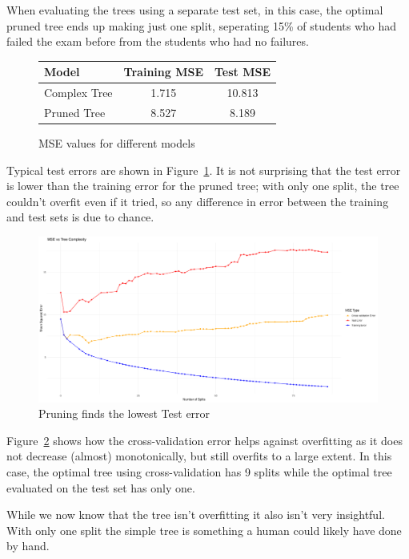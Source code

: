 \documentclass[12pt]{article}
\begin{document}
When evaluating the trees using a separate test set, in this case, the optimal pruned tree ends up making just one split, seperating 15\% of students who had failed the exam before from the students who had no failures.

\begin{figure}
    \centering
    \begin{tabular}{| l | c | c |}
        \hline
        Model        & Training MSE & Test MSE \\
        \hline
        Complex Tree & 1.715        & 10.813   \\
        Pruned Tree  & 8.527        & 8.189    \\
        \hline
    \end{tabular}
    \caption{MSE values for different models}
    \label{table_pruning}
\end{figure}


Typical test errors are shown in Figure~\ref{table_pruning}. It is not surprising that the test error is lower than the training error for the pruned tree; with only one split, the tree couldn't overfit even if it tried, so any difference in error between the training and test sets is due to chance.


\begin{figure}
    \centering
    \includegraphics[scale=0.30]{triple_pruning_plot.pdf}
    \caption{Pruning finds the lowest Test error}
    \label{prune}
\end{figure}

Figure~\ref{prune} shows how the cross-validation error helps against overfitting as it does not decrease (almost) monotonically, but still overfits to a large extent. In this case, the optimal tree using cross-validation has 9 splits while the optimal tree evaluated on the test set has only one.

While we now know that the tree isn't overfitting it also isn't very insightful. With only one split the simple tree is something a human could likely have done by hand.
\end{document}
